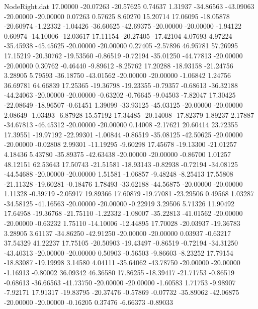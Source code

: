 \begin{filecontents}{NodeRight.dat}
  17.00000  -20.07263  -20.57625     0.74637    1.31937  -34.86563  -43.09063  -20.00000  -20.00000    0.07263    0.57625    8.60270   15.20714
  17.06095  -18.05878  -20.60974    -1.22332   -1.04426  -36.60625  -42.69375  -20.00000  -20.00000   -1.94122    0.60974  -14.10006  -12.03617
  17.11154  -20.27405  -17.42104     4.07693    4.97224  -35.45938  -45.45625  -20.00000  -20.00000    0.27405   -2.57896   46.95781   57.26995
  17.15219  -20.30762  -19.53560    -0.86519   -0.72194  -35.01250  -44.77813  -20.00000  -20.00000    0.30762   -0.46440   -9.89612   -8.25762
  17.20288  -18.93158  -21.24756     3.28905    5.79593  -36.18750  -43.01562  -20.00000  -20.00000   -1.06842    1.24756   36.69781   64.66839
  17.25365  -19.36798  -19.23355    -0.79357   -0.68613  -36.32188  -44.24063  -20.00000  -20.00000   -0.63202   -0.76645   -9.04503   -7.82047
  17.30425  -22.08649  -18.96507    -0.61451    1.39099  -33.93125  -45.03125  -20.00000  -20.00000    2.08649   -1.03493   -6.87928   15.57192
  17.34485  -20.14008  -17.82379     1.89237    2.17887  -34.67813  -46.45312  -20.00000  -20.00000    0.14008   -2.17621   20.60414   23.72355
  17.39551  -19.97192  -22.99301    -1.00844   -0.86519  -35.08125  -42.50625  -20.00000  -20.00000   -0.02808    2.99301  -11.19295   -9.60298
  17.45678  -19.13300  -21.01257     4.18436    5.43780  -35.89375  -42.63438  -20.00000  -20.00000   -0.86700    1.01257   48.12151   62.53643
  17.50743  -21.51581  -18.93143    -0.82938   -0.72194  -34.08125  -44.54688  -20.00000  -20.00000    1.51581   -1.06857   -9.48248   -8.25413
  17.55808  -21.11328  -19.60281    -0.18476    1.78493  -33.62188  -44.56875  -20.00000  -20.00000    1.11328   -0.39719   -2.05917   19.89366
  17.60879  -19.77081  -23.29506     0.49568    1.03287  -34.58125  -41.16563  -20.00000  -20.00000   -0.22919    3.29506    5.71326   11.90492
  17.64958  -19.36768  -21.75110    -1.22332   -1.08007  -35.22813  -41.01562  -20.00000  -20.00000   -0.63232    1.75110  -14.10006  -12.44895
  17.70028  -20.03937  -19.36783     3.28905    3.61137  -34.86250  -42.91250  -20.00000  -20.00000    0.03937   -0.63217   37.54329   41.22237
  17.75105  -20.50903  -19.43497    -0.86519   -0.72194  -34.31250  -43.40313  -20.00000  -20.00000    0.50903   -0.56503   -9.86603   -8.23252
  17.79154  -18.83087  -19.19998     3.14580    4.04111  -35.64062  -43.78750  -20.00000  -20.00000   -1.16913   -0.80002   36.09342   46.36580
  17.86255  -18.39417  -21.71753    -0.86519   -0.68613  -36.66563  -41.73750  -20.00000  -20.00000   -1.60583    1.71753   -9.98907   -7.92171
  17.91317  -19.83795  -20.37476    -0.57869   -0.07732  -35.89062  -42.06875  -20.00000  -20.00000   -0.16205    0.37476   -6.66373   -0.89033

\end{filecontents}
